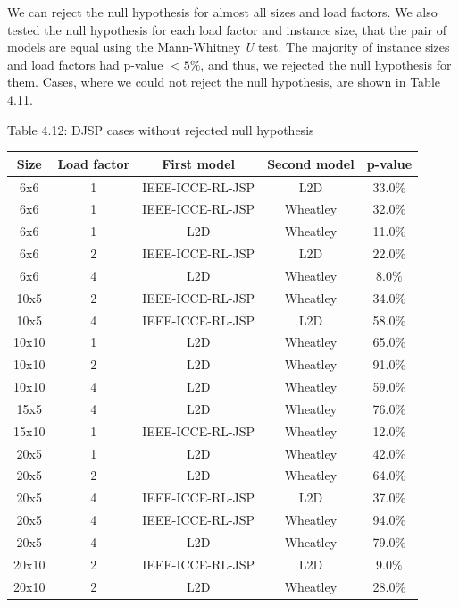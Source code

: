 We can reject the null hypothesis for almost all sizes and load factors. We also tested the null hypothesis for each load factor and instance size, that the pair of models are equal using the Mann-Whitney \textit{U} test. The majority of instance sizes and load factors had p-value $< 5\%$, and thus, we rejected the null hypothesis for them. Cases, where we could not reject the null hypothesis, are shown in Table 4.11.

\begin{table}
    Table 4.12: DJSP cases without rejected null hypothesis\\
    \vspace{1mm}
    \label{table:4.9}
    \begin{tabular}{ccccc}
        \toprule
        Size & Load factor & First model & Second model & p-value \\
        \midrule
        6x6 & 1 & IEEE-ICCE-RL-JSP & L2D & 33.0$\%$ \\
        6x6 & 1 & IEEE-ICCE-RL-JSP & Wheatley & 32.0$\%$ \\
        6x6 & 1 & L2D & Wheatley & 11.0$\%$ \\
        6x6 & 2 & IEEE-ICCE-RL-JSP & L2D & 22.0$\%$ \\
        6x6 & 4 & L2D & Wheatley & 8.0$\%$ \\
        10x5 & 2 & IEEE-ICCE-RL-JSP & Wheatley & 34.0$\%$ \\
        10x5 & 4 & IEEE-ICCE-RL-JSP & L2D & 58.0$\%$ \\
        10x10 & 1 & L2D & Wheatley & 65.0$\%$ \\
        10x10 & 2 & L2D & Wheatley & 91.0$\%$ \\
        10x10 & 4 & L2D & Wheatley & 59.0$\%$ \\
        15x5 & 4 & L2D & Wheatley & 76.0$\%$ \\
        15x10 & 1 & IEEE-ICCE-RL-JSP & Wheatley & 12.0$\%$ \\
        20x5 & 1 & L2D & Wheatley & 42.0$\%$ \\
        20x5 & 2 & L2D & Wheatley & 64.0$\%$ \\
        20x5 & 4 & IEEE-ICCE-RL-JSP & L2D & 37.0$\%$ \\
        20x5 & 4 & IEEE-ICCE-RL-JSP & Wheatley & 94.0$\%$ \\
        20x5 & 4 & L2D & Wheatley & 79.0$\%$ \\
        20x10 & 2 & IEEE-ICCE-RL-JSP & L2D & 9.0$\%$ \\
        20x10 & 2 & L2D & Wheatley & 28.0$\%$ \\

\end{tabular}
\end{table}

